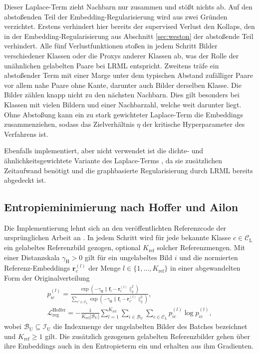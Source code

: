 Dieser Laplace-Term zieht Nachbarn nur zusammen und stößt nichts ab. Auf den abstoßenden Teil der Embedding-Regularisierung wird aus zwei Gründen verzichtet. Erstens verhindert hier bereits der supervised Verlust den Kollaps, den in der Embedding-Regularisierung aus Abschnitt \ref{sec:weston} der abstoßende Teil verhindert. Alle fünf Verlustfunktionen stoßen in jedem Schritt Bilder verschiedener Klassen oder die Proxys anderer Klassen ab, was der Rolle der unähnlichen gelabelten Paare bei \ac{LRML} entspricht. Zweitens träfe ein abstoßender Term mit einer Marge unter dem typischen Abstand zufälliger Paare vor allem nahe Paare ohne Kante, darunter auch Bilder derselben Klasse. Die Bilder zählen knapp nicht zu den nächsten Nachbarn. Dies gilt besonders bei Klassen mit vielen Bildern und einer Nachbarzahl, welche weit darunter liegt. Ohne Abstoßung kann ein zu stark gewichteter Laplace-Term die Embeddings zusammenziehen, sodass das Zielverhältnis $\eta$ der kritische Hyperparameter des Verfahrens ist.

Ebenfalls implementiert, aber nicht verwendet ist die dichte- und ähnlichkeitsgewichtete Variante des Laplace-Terms \cite{ying_manifold_2018}, da sie zusätzlichen Zeitaufwand benötigt und die graphbasierte Regularisierung durch \ac{LRML} bereits abgedeckt ist. 

\subsection{Entropieminimierung nach Hoffer und Ailon}
\label{sec:m:hoffer}

Die Implementierung lehnt sich an den veröffentlichten Referenzcode der ursprünglichen Arbeit an \cite{hoffer_semi-supervised_2018}. In jedem Schritt wird für jede bekannte Klasse $c\in\mathcal{C}_{\mathrm{L}}$ ein gelabeltes Referenzbild gezogen, optional $K_{\mathrm{ref}}$ solcher Referenzmengen. Mit einer Distanzskala $\gamma_{\mathrm{H}}>0$ gilt für ein ungelabeltes Bild $i$ und die normierten Referenz-Embeddings $\bm{r}_c^{(l)}$ der Menge $l\in\{1,\dots,K_{\mathrm{ref}}\}$ in einer abgewandelten Form der Originalverteilung \cite{hoffer_semi-supervised_2018} 
\begin{equation}
  \begin{gathered}
  p^{(l)}_{ic}=\frac{\exp(-\gamma_{\mathrm{H}}\lVert\bm{f}_i-\bm{r}^{(l)}_c\rVert_2^2)}{\sum_{c'\in\mathcal{C}_{\mathrm{L}}}\exp(-\gamma_{\mathrm{H}}\lVert\bm{f}_i-\bm{r}^{(l)}_{c'}\rVert_2^2)},\\
  \mathcal{L}_{\mathrm{reg}}^{\mathrm{Hoffer}}=-\frac{1}{K_{\mathrm{ref}}|\mathcal{B}_{\mathrm{U}}|}\sum_{l=1}^{K_{\mathrm{ref}}}\sum_{i\in\mathcal{B}_{\mathrm{U}}}\sum_{c\in\mathcal{C}_{\mathrm{L}}}p^{(l)}_{ic}\log p^{(l)}_{ic},
  \end{gathered}
  \label{eq:m:hoffer}
\end{equation}
wobei $\mathcal{B}_{\mathrm{U}}\subseteq\mathcal{I}_{\mathrm{U}}$ die Indexmenge der ungelabelten Bilder des Batches bezeichnet und $K_{\mathrm{ref}}\ge1$ gilt. Die zusätzlich gezogenen gelabelten Referenzbilder gehen über ihre Embeddings auch in den Entropieterm ein und erhalten aus ihm Gradienten. 


